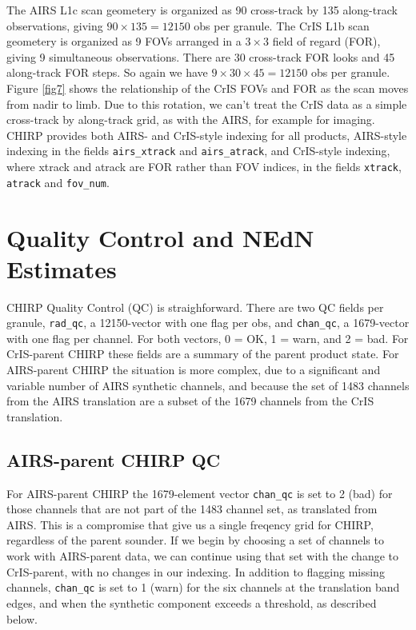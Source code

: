 \documentclass[12pt]{article}
\begin{document}
The AIRS L1c scan geometery is organized as 90 cross-track by 135
along-track observations, giving $90 \times 135 = 12150$ obs per
granule.  The CrIS L1b scan geometery is organized as 9 FOVs
arranged in a $3 \times 3$ field of regard (FOR), giving 9
simultaneous observations.  There are 30 cross-track FOR looks and
45 along-track FOR steps.  So again we have $9 \times 30 \times 45 =
12150$ obs per granule.  Figure \ref{fig7} shows the relationship of
the CrIS FOVs and FOR as the scan moves from nadir to limb.  Due to
this rotation, we can't treat the CrIS data as a simple cross-track
by along-track grid, as with the AIRS, for example for imaging.
CHIRP provides both AIRS- and CrIS-style indexing for all products,
AIRS-style indexing in the fields \texttt{airs\_xtrack} and
\texttt{airs\_atrack}, and CrIS-style indexing, where xtrack and
atrack are FOR rather than FOV indices, in the fields
\texttt{xtrack}, \texttt{atrack} and \texttt{fov\_num}.

\section{Quality Control and NEdN Estimates}
\label{qcnedn}

CHIRP Quality Control (QC) is straighforward.  There are two QC
fields per granule, \texttt{rad\_qc}, a 12150-vector with one flag
per obs, and \texttt{chan\_qc}, a 1679-vector with one flag per
channel.  For both vectors, 0 = OK, 1 = warn, and 2 = bad.  For
CrIS-parent CHIRP these fields are a summary of the parent product
state.  For AIRS-parent CHIRP the situation is more complex, due to
a significant and variable number of AIRS synthetic channels, and
because the set of 1483 channels from the AIRS translation are a
subset of the 1679 channels from the CrIS translation.

\subsection{AIRS-parent CHIRP QC}

For AIRS-parent CHIRP the 1679-element vector \texttt{chan\_qc} is
set to 2 (bad) for those channels that are not part of the 1483
channel set, as translated from AIRS.  This is a compromise that
give us a single freqency grid for CHIRP, regardless of the parent
sounder.  If we begin by choosing a set of channels to work with
AIRS-parent data, we can continue using that set with the change to
CrIS-parent, with no changes in our indexing.  In addition to
flagging missing channels, \texttt{chan\_qc} is set to 1 (warn) for
the six channels at the translation band edges, and when the
synthetic component exceeds a threshold, as described below.
\end{document}
